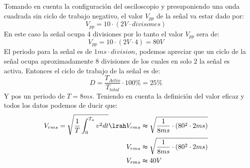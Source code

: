 Tomando en cuenta la configuración del osciloscopio y presuponiendo una onda cuadrada sin ciclo de trabajo negativo, el valor $V_{pp}$ de la señal va estar dado por:
\begin{equation}
    V_{pp}=10\cdot(2V\cdot divisones)
\end{equation}
En este caso la señal ocupa $4$ divisiones por lo tanto el valor $V_{pp}$ sera de:
\begin{equation}
    V_{pp}=10\cdot(2V\cdot 4)=80V
\end{equation}
El periodo para la señal es de $1ms\cdot division$, podemos apreciar que un ciclo de la señal ocupa aproximadamente $8$ divisiones de los cuales en solo $2$ la señal es activa. Entonces el ciclo de trabajo de la señal es de:
\begin{equation}
    D=\frac{T_{Actio}}{T_{total}}\cdot100\%=25\%
\end{equation}
Y pos un periodo de $T=8ms$.
Teniendo en cuenta la definición del valor eficaz y todos los datos podemos de ducir que:
\begin{equation}
\begin{aligned}
     V_{rms}=\sqrt{\frac{1}{T}\int_{0}^{T_{a}}v^2dt}\lrah &V_{rms}\thickapprox\sqrt{\frac{1}{8ms}\cdot(80^2 \cdot2ms)}\\
                                                    &V_{rms}\thickapprox\sqrt{\frac{1}{8ms}\cdot(80^2\cdot 2ms)}\\
                                                    &V_{rms}\thickapprox40V
\end{aligned}
\end{equation}
